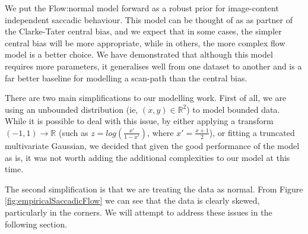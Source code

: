 We put the Flow:normal model forward as a robust prior for image-content independent saccadic behaviour. This model can be thought of as as partner of the Clarke-Tater central bias, and we expect that in some cases, the simpler central bias will be more appropriate, while in others, the more complex flow model is a better choice. We have demonstrated that although this model requires more parameters, it generalises well from one dataset to another and is a far better baseline for modelling a scan-path than the central bias.

There are two main simplifications to our modelling work. First of all, we are using an unbounded distribution (ie, $(x,y)\in \mathbb{R}^2$) to model bounded data. While it is possible to deal with this issue, by either applying a transform $(-1,1)\rightarrow \mathbb{R}$ (such as $z=log(\frac{x'}{1-x'})$, where $x'=\frac{x+1}{2}$), or fitting a truncated multivariate Gaussian, we decided that given the good performance of the model as is, it was not worth adding the additional complexities to our model at this time. 

The second simplification is that we are treating the data as normal. From Figure \ref{fig:empiricalSaccadicFlow} we can see that the data is clearly skewed, particularly in the corners. We will attempt to address these issues in the following section.